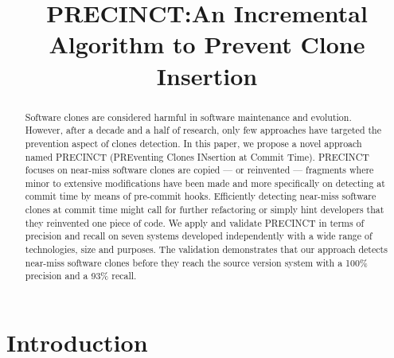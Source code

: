 \documentclass[conference]{IEEEtran}
\begin{document}
\title{PRECINCT:\@ An Incremental Algorithm to Prevent Clone Insertion}


\author{
\and
{}
}

\maketitle

\begin{abstract}
  Software clones are considered harmful in software maintenance and evolution. However, after a decade and a half of research, only few approaches have targeted the prevention aspect of clones detection.
  In this paper, we propose a novel approach named PRECINCT (PREventing Clones INsertion at Commit Time). PRECINCT focuses on near-miss software clones are copied --- or reinvented --- fragments where minor to extensive modifications have been made and more specifically on detecting at commit time by means of pre-commit hooks.
  Efficiently detecting near-miss software clones at commit time might call for further refactoring or simply hint developers that they reinvented one piece of code.
  We apply and validate PRECINCT in terms of precision and recall on seven systems developed independently with a wide range of technologies, size and purposes.
  The validation demonstrates that our approach detects near-miss software clones before they reach the source version system with a 100\% precision and a 93\% recall.



\end{abstract}


\IEEEpeerreviewmaketitle

\section{Introduction}
\label{sec:Introduction}
\end{document}
